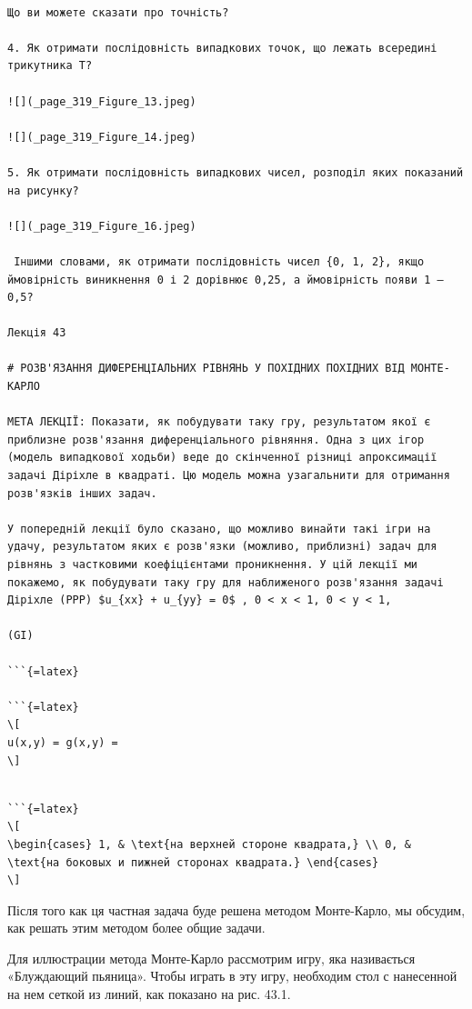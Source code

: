 \documentclass[
]{article}
\begin{document}
\begin{verbatim}

Що ви можете сказати про точність?

4. Як отримати послідовність випадкових точок, що лежать всередині трикутника T?

![](_page_319_Figure_13.jpeg)

![](_page_319_Figure_14.jpeg)

5. Як отримати послідовність випадкових чисел, розподіл яких показаний на рисунку?

![](_page_319_Figure_16.jpeg)

 Іншими словами, як отримати послідовність чисел {0, 1, 2}, якщо ймовірність виникнення 0 і 2 дорівнює 0,25, а ймовірність появи 1 — 0,5?

Лекція 43

# РОЗВ'ЯЗАННЯ ДИФЕРЕНЦІАЛЬНИХ РІВНЯНЬ У ПОХІДНИХ ПОХІДНИХ ВІД МОНТЕ-КАРЛО

МЕТА ЛЕКЦІЇ: Показати, як побудувати таку гру, результатом якої є приблизне розв'язання диференціального рівняння. Одна з цих ігор (модель випадкової ходьби) веде до скінченної різниці апроксимації задачі Діріхле в квадраті. Цю модель можна узагальнити для отримання розв'язків інших задач.

У попередній лекції було сказано, що можливо винайти такі ігри на удачу, результатом яких є розв'язки (можливо, приблизні) задач для рівнянь з частковими коефіцієнтами проникнення. У цій лекції ми покажемо, як побудувати таку гру для наближеного розв'язання задачі Діріхле (PPP) $u_{xx} + u_{yy} = 0$ , 0 < x < 1, 0 < y < 1,

(GI)

```{=latex}

```{=latex}
\[
u(x,y) = g(x,y) =
\]
\end{verbatim}

\begin{verbatim}

```{=latex}
\[
\begin{cases} 1, & \text{на верхней стороне квадрата,} \\ 0, & \text{на боковых и пижней сторонах квадрата.} \end{cases}
\]
\end{verbatim}

Після того как ця частная задача буде решена методом Монте-Карло, мы
обсудим, как решать этим методом более общие задачи.

Для иллюстрации метода Монте-Карло рассмотрим игру, яка називається
«Блуждающий пьяница». Чтобы играть в эту игру, необходим стол с
нанесенной на нем сеткой из линий, как показано на рис. 43.1.
\end{document}
